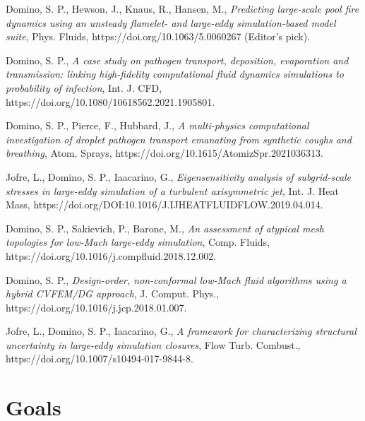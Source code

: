 \documentclass[letterpaper]{twentysecondcv_spd} %
\begin{document}
\begin{twentyshort} %

 {Domino, S. P., Hewson, J., Knaus, R., Hansen, M., \textit{Predicting large-scale pool fire dynamics using an unsteady flamelet- and large-eddy simulation-based model suite}, Phys. Fluids, https://doi.org/10.1063/5.0060267 (Editor's pick).}

 {Domino, S. P.,  \textit{A case study on pathogen transport, deposition, evaporation and transmission: linking high-fidelity computational fluid dynamics simulations to probability of infection}, Int. J. CFD, https://doi.org/10.1080/10618562.2021.1905801.}

 {Domino, S. P., Pierce, F., Hubbard, J.,  \textit{A multi-physics computational investigation of droplet pathogen transport emanating from synthetic coughs and breathing}, Atom. Sprays, https://doi.org/10.1615/AtomizSpr.2021036313.}

 {Jofre, L., Domino, S. P., Iaacarino, G.,  \textit{Eigensensitivity analysis of subgrid-scale stresses in large-eddy simulation of a turbulent axisymmetric jet}, Int. J. Heat Mass, https://doi.org/DOI:10.1016/J.IJHEATFLUIDFLOW.2019.04.014.}

 {Domino, S. P., Sakievich, P., Barone, M.,  \textit{An assessment of atypical mesh topologies for low-Mach large-eddy simulation}, Comp. Fluids, https://doi.org/10.1016/j.compfluid.2018.12.002.}

 {Domino, S. P.,  \textit{Design-order, non-conformal low-Mach fluid algorithms using a hybrid CVFEM/DG approach}, J. Comput. Phys., https://doi.org/10.1016/j.jcp.2018.01.007.}

 {Jofre, L., Domino, S. P., Iaacarino, G.,  \textit{A framework for characterizing structural uncertainty in large-eddy simulation closures}, Flow Turb. Combust., https://doi.org/10.1007/s10494-017-9844-8.}

\end{twentyshort} 


\section{Goals}
\end{document}

